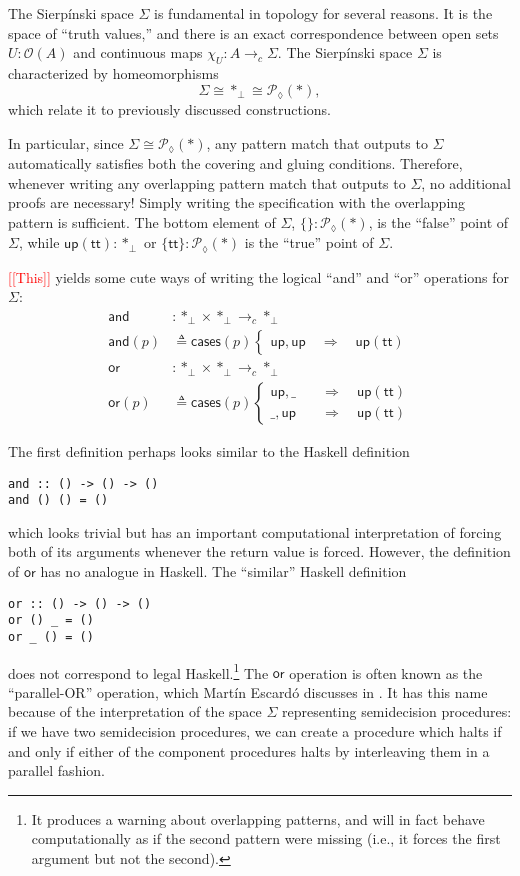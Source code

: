 \documentclass[conference]{IEEEtran}
\newcommand{\PLower}{\mathcal{P}_\lozenge}
\newcommand{\cto}{\to_c}
\newcommand{\One}{\ast}
\newcommand{\Open}[1]{\mathcal{O}({#1})}
\newcommand{\wildcard}{\_}
\newcommand{\Branch}{\Rightarrow}
\newcommand{\note}[1]{\textcolor{red}{[[{#1}]]}}
\newcommand{\up}{\mathsf{up}}
\begin{document}
The Sierp\'inski space $\Sigma$ is fundamental in topology for several reasons. It is the space of ``truth values,'' and there is an exact correspondence between open sets $U : \Open{A}$ and continuous maps $\chi_U : A \cto \Sigma$. The Sierp\'inski space $\Sigma$ is characterized by homeomorphisms
\[
\Sigma \cong \One_\bot \cong \PLower(\One) ,
\]
which relate it to previously discussed constructions.

In particular, since $\Sigma \cong \PLower(\One)$, any pattern match that outputs to $\Sigma$ automatically satisfies both the covering and gluing conditions. Therefore, whenever writing any overlapping pattern match that outputs to $\Sigma$, no additional proofs are necessary! Simply writing the specification with the overlapping pattern is sufficient. The bottom element of $\Sigma$, $\{ \} : \PLower(\One)$, is the ``false'' point of $\Sigma$, while $\up(\mathsf{tt}) : \One_\bot$ or $\{ \mathsf{tt} \} : \PLower(\One)$ is the ``true'' point of $\Sigma$.

\note{This} yields some cute ways of writing the logical ``and'' and ``or'' operations for $\Sigma$:
\begin{align*}
\mathsf{and} &: \One_\bot \times \One_\bot \cto \One_\bot
\\ \mathsf{and}(p) &\triangleq \mathsf{cases}(p)
\begin{cases}
\up , \up
  \quad \Branch \quad \up(\mathsf{tt})
\end{cases}
\\
\mathsf{or} &: \One_\bot \times \One_\bot \cto \One_\bot
\\ \mathsf{or}(p) &\triangleq \mathsf{cases}(p)
\begin{cases}
\up , \wildcard
  \quad &\Branch \quad \up(\mathsf{tt})
\\  \wildcard , \up
  \quad &\Branch \quad \up(\mathsf{tt})
\end{cases}
\end{align*}

The first definition perhaps looks similar to the Haskell definition
\begin{verbatim}
and :: () -> () -> ()
and () () = ()
\end{verbatim}
which looks trivial but has an important computational interpretation of forcing both of its arguments whenever the return value is forced. However, the definition of $\mathsf{or}$ has no analogue in Haskell. The ``similar'' Haskell definition
\begin{verbatim}
or :: () -> () -> ()
or () _ = ()
or _ () = ()
\end{verbatim}
does not correspond to legal Haskell.\footnote{It produces a warning about overlapping patterns, and will in fact behave computationally as if the second pattern were missing (i.e., it forces the first argument but not the second).} The $\mathsf{or}$ operation is often known as the ``parallel-OR'' operation, which Mart\'in Escard\'o discusses in \cite{escardo2004}. It has this name because of the interpretation of the space $\Sigma$ representing semidecision procedures: if we have two semidecision procedures, we can create a procedure which halts if and only if either of the component procedures halts by interleaving them in a parallel fashion.
\end{document}

